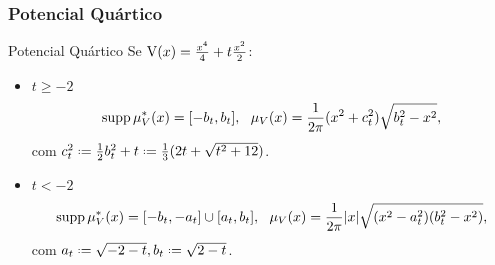 %			
%	
%		
%			
%
%	

\begin{frame}
	\frametitle{Potencial Quártico}
	\begin{block}{Potencial Quártico}
		Se $\operatorname{V}(x) = \frac{x^4}{4} + t \frac{x^2}{2}$:
		\begin{itemize}
			\item \(t \geq -2\)
			\[
			\supp \mu^*_V(x) = [-b_t, b_t], \ \ \mu_V(x) = \frac{1}{2\pi} (x^2 + c_t^2) \sqrt{b_t^2 - x^2},\label{Equação: Quartico +}
			\]
			com $c_t^2 \deff\frac{1}{2} b_t^2 + t \deff \frac{1}{3} (2t + \sqrt{t^2 + 12})$.
			\pause
			\item \(t < -2\)
			\[
			\operatorname{supp} \mu^*_V(x) = [-b_t, -a_t] \cup [a_t, b_t], \ \ \mu_V(x) = \frac{1}{2\pi} |x| \sqrt{(x^2 - a_t^2)(b_t^2 - x^2)},
			\label{Equação: Quartico -}
			\]
			com $ a_t \deff \sqrt{-2-t}, b_t \deff \sqrt{2-t}$.
		\end{itemize}
	\end{block}
\end{frame}

